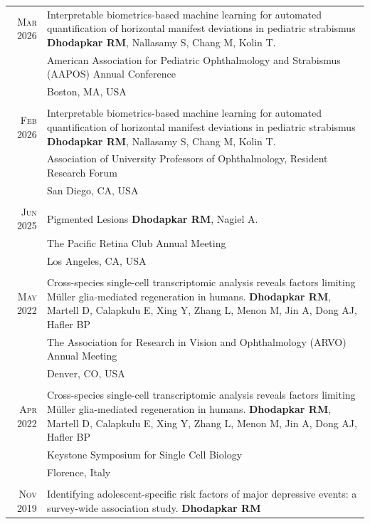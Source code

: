 \documentclass[a4paper,10pt]{article}
\begin{document}
\begin{tabular}{rp{11cm}}

 \textsc{Mar} 2026 & Interpretable biometrics-based machine learning for automated quantification of horizontal manifest deviations in pediatric strabismus {\bf Dhodapkar RM}, Nallasamy S, Chang M, Kolin T. \\
 								 & American Association for Pediatric Ophthalmology and Strabismus (AAPOS) Annual Conference \\
 								 & Boston, MA, USA  \\
 \multicolumn{2}{c}{} \\
 \textsc{Feb} 2026 & Interpretable biometrics-based machine learning for automated quantification of horizontal manifest deviations in pediatric strabismus {\bf Dhodapkar RM}, Nallasamy S, Chang M, Kolin T. \\
 								 & Association of University Professors of Ophthalmology, Resident Research Forum \\
 								 & San Diego, CA, USA  \\
 \multicolumn{2}{c}{} \\
 \textsc{Jun} 2025 & Pigmented Lesions {\bf Dhodapkar RM}, Nagiel A. \\
 								 & The Pacific Retina Club Annual Meeting \\
 								 & Los Angeles, CA, USA  \\
 \multicolumn{2}{c}{} \\
 \textsc{May} 2022 & Cross-species single-cell transcriptomic analysis reveals factors limiting Müller glia-mediated regeneration in humans. {\bf Dhodapkar RM}, Martell D, Calapkulu E, Xing Y, Zhang L, Menon M, Jin A, Dong AJ, Hafler BP \\
 								 & The Association for Research in Vision and Ophthalmology (ARVO) Annual Meeting \\
 								 & Denver, CO, USA  \\
 \multicolumn{2}{c}{} \\
 \textsc{Apr} 2022 & Cross-species single-cell transcriptomic analysis reveals factors limiting Müller glia-mediated regeneration in humans. {\bf Dhodapkar RM}, Martell D, Calapkulu E, Xing Y, Zhang L, Menon M, Jin A, Dong AJ, Hafler BP\\
 								 & Keystone Symposium for Single Cell Biology \\
 								 & Florence, Italy  \\
 \multicolumn{2}{c}{} \\
 \textsc{Nov} 2019 & Identifying adolescent-specific risk factors of major depressive events: a survey-wide association study. {\bf Dhodapkar RM} \\

\end{tabular}
\end{document}
